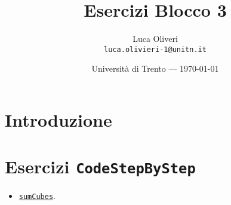 \documentclass{article}
\title{Esercizi Blocco 3} %
\author{Luca Oliveri\\ \texttt{luca.olivieri-1@unitn.it}} %
\date{Università di Trento --- \today} %
\begin{document}
\maketitle %

\section*{Introduzione} %

\setcounter{section}{4}



\subsection{}




\section*{Esercizi \texttt{CodeStepByStep}}
\begin{itemize}
	\item \href{https://www.codestepbystep.com/problem/view/cpp/algorithms/sumCubes}{\texttt{sumCubes}}. 
\end{itemize}
\end{document}
